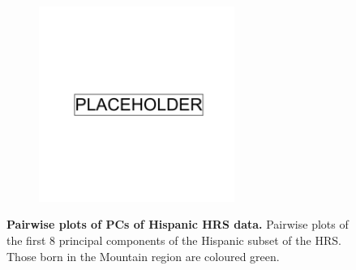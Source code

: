 \begin{figure}[ht]
    \centering
    \begin{subfigure}{\textwidth}
    \includegraphics[width=0.7\textwidth]{placeholder.png}
    \end{subfigure}
    \caption[Pairwise plots of PCs of Hispanic HRS data]{\textbf{Pairwise plots of PCs of Hispanic HRS data.} Pairwise plots of the first 8 principal components of the Hispanic subset of the HRS. Those born in the Mountain region are coloured green.}
    \label{fig:supp_hrs_hisp_grid}
\end{figure}

\newpage

